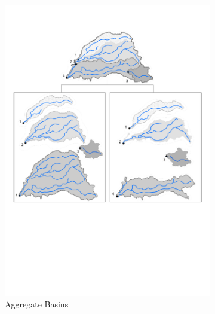 \begin{figure}
\begin{subfigure}{.35\textwidth}
 		 \includegraphics[width=\textwidth, trim={0 13cm 15cm 12.65cm}, clip=true]{plots/agg_and_inc_basins.pdf}
  		\caption{Aggregate Basins}
  		\label{fig:aggbasins}
	\end{subfigure}%
	\begin{subfigure}{.35\textwidth}
  		\centering

\end{subfigure}
\end{figure}

